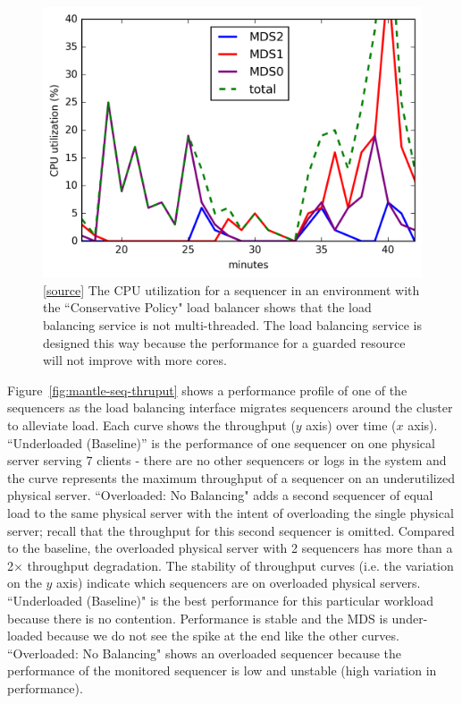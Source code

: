 \documentclass[preprint]{sigplanconf-eurosys}
\begin{document}
\begin{figure}[t!]
\centering
\includegraphics{figures/mantle-cpu-utilization.png}
\caption{[\href{https://github.com/double-blind-submitter/osdi16}{source}] The
CPU utilization for a sequencer in an environment with the ``Conservative
Policy" load balancer shows that the load balancing service is not
multi-threaded. The load balancing service is designed this way because the
performance for a guarded resource will not improve with more cores.}
\label{fig:mantle-cpu-utilization}
\end{figure}

Figure~\ref{fig:mantle-seq-thruput} shows a performance profile of one of the
sequencers as the load balancing interface migrates sequencers around the
cluster to alleviate load.  Each curve shows the throughput (\(y\) axis) over
time (\(x\) axis).  ``Underloaded (Baseline)'' is the performance of one sequencer
on one physical server serving 7 clients - there are no other sequencers or
logs in the system and the curve represents the maximum throughput of a
sequencer on an underutilized physical server.  ``Overloaded: No Balancing" adds a
second sequencer of equal load to the same physical server with the intent of
overloading the single physical server; recall that the throughput for this
second sequencer is omitted. Compared to the baseline, the overloaded physical
server with 2 sequencers has more than a 2\(\times\) throughput degradation.
The stability of throughput curves (i.e. the variation on the \(y\) axis) indicate which sequencers
are on overloaded physical servers.  ``Underloaded (Baseline)" is the best
performance for this particular workload because there is no contention.
Performance is stable and the MDS is under-loaded because we do not see the
spike at the end like the other curves.  ``Overloaded: No Balancing" shows an
overloaded sequencer because the performance of the monitored sequencer is low
and unstable (high variation in performance). 
\end{document}

